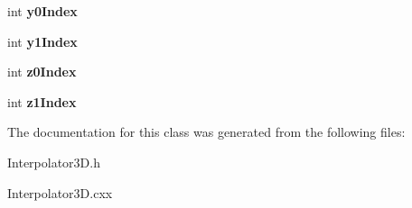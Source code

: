 \begin{DoxyCompactItemize}
\item 
\hypertarget{class_interpolator3_d_aadf9a85254d110fe4a2dd9e75cceb68d}{
int {\bfseries y0Index}}
\label{class_interpolator3_d_aadf9a85254d110fe4a2dd9e75cceb68d}

\item 
\hypertarget{class_interpolator3_d_a7140d7968e1fa325d564b4f3e43f85fc}{
int {\bfseries y1Index}}
\label{class_interpolator3_d_a7140d7968e1fa325d564b4f3e43f85fc}

\item 
\hypertarget{class_interpolator3_d_a936233f4ee4ab142f40abd22b891f544}{
int {\bfseries z0Index}}
\label{class_interpolator3_d_a936233f4ee4ab142f40abd22b891f544}

\item 
\hypertarget{class_interpolator3_d_ac2285e4d8b84f078d393eb897db100e7}{
int {\bfseries z1Index}}
\label{class_interpolator3_d_ac2285e4d8b84f078d393eb897db100e7}

\end{DoxyCompactItemize}


The documentation for this class was generated from the following files:\begin{DoxyCompactItemize}
\item 
Interpolator3D.h\item 
Interpolator3D.cxx\end{DoxyCompactItemize}
